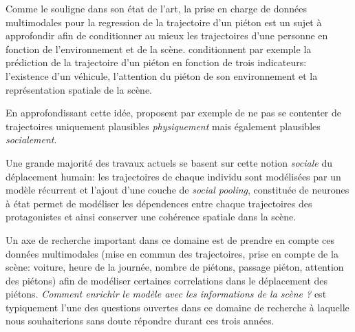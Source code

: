 Comme le souligne \cite{kong2018human} dans son état de l'art, la prise en charge de données multimodales pour la regression de la trajectoire d'un piéton est un sujet à approfondir afin de conditionner au mieux les trajectoires d'une personne en fonction de l'environnement et de la scène.
\cite{kooij2014context} conditionnent par exemple la prédiction de la trajectoire d'un piéton en fonction de trois indicateurs: l'existence d'un véhicule, l'attention du piéton de son environnement et la représentation spatiale de la scène.

En approfondissant cette idée, \cite{2018arXiv180310892G} proposent par exemple de ne pas se contenter de trajectoires uniquement plausibles \textit{physiquement} mais également plausibles \textit{socialement}. 

Une grande majorité des travaux actuels \cite{alahi2016social,lee2017desire,2018arXiv180310892G} se basent sur cette notion \textit{sociale} du déplacement humain: les trajectoires de chaque individu sont modélisées par un modèle récurrent et l'ajout d'une couche de \textit{social pooling}, constituée de neurones à état permet de modéliser les dépendences entre chaque trajectoires des protagonistes et ainsi conserver une cohérence spatiale dans la scène.

Un axe de recherche important dans ce domaine est de prendre en compte ces données multimodales (mise en commun des trajectoires, prise en compte de la scène: voiture, heure de la journée, nombre de piétons, passage piéton, attention des piétons) afin de modéliser certaines correlations dans le déplacement des piétons. \textit{Comment enrichir le modèle avec les informations de la scène ?} est typiquement l'une des questions ouvertes dans ce domaine de recherche à laquelle nous souhaiterions sans doute répondre durant ces trois années.
